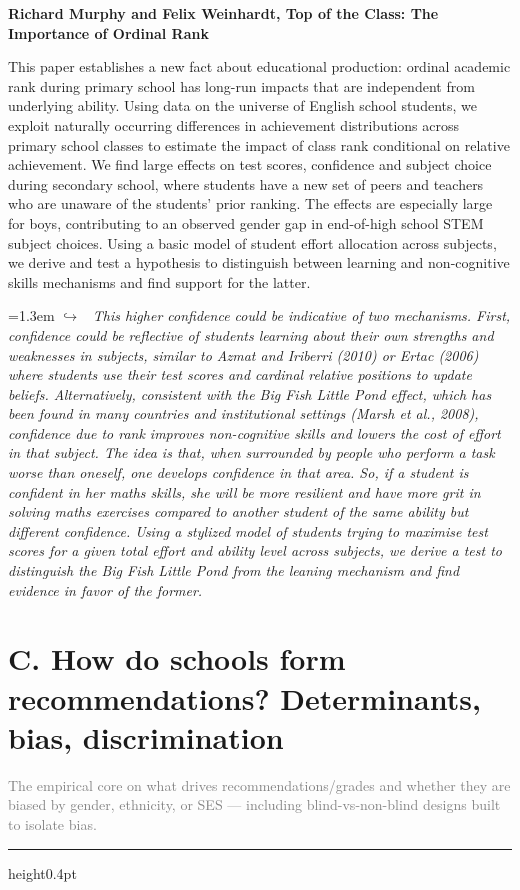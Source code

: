 \documentclass[11pt]{article}
\newcommand{\entry}[3]{%
  \par\medskip\noindent\textbf{#1}\par
  \nopagebreak #2\hspace{0.35em}{\small\color{tagcol}[#3]}\par}
\newcommand{\note}[1]{\par\smallskip\noindent\hangindent=1.3em
  \textcolor{notecol}{\footnotesize$\hookrightarrow$~\textit{#1}}}
\newcommand{\secintro}[1]{\par\smallskip\noindent\textcolor{grey}{\small #1}\par
  \vspace{2pt}\hrule height0.4pt\vspace{4pt}}
\begin{document}
  \entry{Richard Murphy and Felix Weinhardt, Top of the Class: The Importance of Ordinal Rank}{This paper establishes a new fact about educational production: ordinal academic rank during
primary school has long-run impacts that are independent from underlying ability. Using data on
the universe of English school students, we exploit naturally occurring differences in achievement
distributions across primary school classes to estimate the impact of class rank conditional on
relative achievement. We find large effects on test scores, confidence and subject choice during
secondary school, where students have a new set of peers and teachers who are unaware of the
students’ prior ranking. The effects are especially large for boys, contributing to an observed
gender gap in end-of-high school STEM subject choices. Using a basic model of student effort
allocation across subjects, we derive and test a hypothesis to distinguish between learning and
non-cognitive skills mechanisms and find support for the latter.
}{rt}
\note{ This higher confidence could be indicative of two mechanisms. First, confidence could be reflective of students learning about their own strengths and weaknesses in subjects, similar to Azmat and Iriberri (2010) or Ertac (2006) where students use their test scores and cardinal relative
positions to update beliefs. Alternatively, consistent with the Big Fish Little Pond effect, which
has been found in many countries and institutional settings (Marsh et al., 2008), confidence due to
rank improves non-cognitive skills and lowers the cost of effort in that subject. The idea is that,
when surrounded by people who perform a task worse than oneself, one develops confidence in
that area. So, if a student is confident in her maths skills, she will be more resilient and have more
grit in solving maths exercises compared to another student of the same ability but different confidence. Using a stylized model of students trying to maximise test scores for a given total effort
and ability level across subjects, we derive a test to distinguish the Big Fish Little Pond from the
leaning mechanism and find evidence in favor of the former.
 }



\section{C. How do schools form recommendations? Determinants, bias, discrimination}
\secintro{The empirical core on what drives recommendations/grades and whether they are
biased by gender, ethnicity, or SES --- including blind-vs-non-blind designs built to
isolate bias.}
\end{document}
